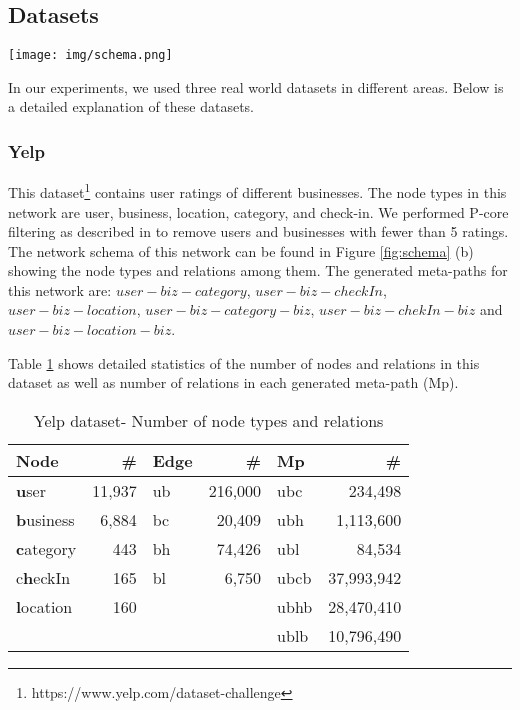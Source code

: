 \documentclass {acmart}
\begin{document}
\subsection{Datasets}
\begin{figure*}[tbh]
	\centering
	\texttt{[image: img/schema.png]}
	\caption{\label{fig:schema} Network Schema: (a) Book Crossing, (b) Yelp, (c) MovieLens}
\end{figure*}
In our experiments, we used three real world datasets in different areas. Below is a detailed explanation of these datasets.

\subsubsection*{Yelp}
This dataset\footnote{https://www.yelp.com/dataset-challenge} contains user ratings of different businesses. The node types in this network are user, business, location, category, and check-in. We performed P-core filtering as described in \cite{Gemmell:2012:RRS:2169472.2169715} to remove users and businesses with fewer than 5 ratings. The network schema of this network can be found in Figure \ref{fig:schema} (b) showing the node types and relations among them. The generated meta-paths for this network are: $user-biz-category$, $user-biz-checkIn$, $user-biz-location$, $user-biz-category-biz$, $user-biz-chekIn-biz$ and $user-biz-location-biz$. 

Table \ref{tab:yp} shows detailed statistics of the number of nodes and relations in this dataset as well as number of relations in each generated meta-path (Mp).
    
    \begin{table}[ht]
  \centering
  \caption{Yelp dataset- Number of node types and relations  }
  \label{tab:yp}
  \begin{tabular}{l|r||l|r ||l|r}
    Node & \# & Edge & \# & Mp & \#\\
    \hline
    \textbf{u}ser  & 11,937 & ub & 216,000 &ubc & 234,498\\
    \textbf{b}usiness  & 6,884 & bc & 20,409 &ubh & 1,113,600\\
    \textbf{c}ategory  & 443 & bh & 74,426 & ubl& 84,534\\
    c\textbf{h}eckIn  & 165 & bl & 6,750 &ubcb & 37,993,942\\
    \textbf{l}ocation  & 160 &  & & ubhb& 28,470,410\\
      &  &  & & ublb& 10,796,490\\
  \end{tabular}
\end{table}
    
\end{document}
